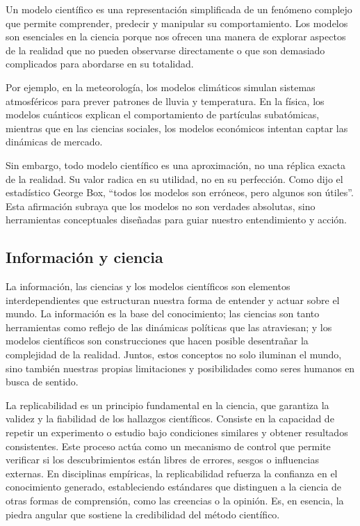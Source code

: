 \documentclass[
  letterpaper,
  DIV=11,
  numbers=noendperiod]{scrreprt}
\begin{document}
Un modelo científico es una representación simplificada de un fenómeno
complejo que permite comprender, predecir y manipular su comportamiento.
Los modelos son esenciales en la ciencia porque nos ofrecen una manera
de explorar aspectos de la realidad que no pueden observarse
directamente o que son demasiado complicados para abordarse en su
totalidad.

Por ejemplo, en la meteorología, los modelos climáticos simulan sistemas
atmosféricos para prever patrones de lluvia y temperatura. En la física,
los modelos cuánticos explican el comportamiento de partículas
subatómicas, mientras que en las ciencias sociales, los modelos
económicos intentan captar las dinámicas de mercado.

Sin embargo, todo modelo científico es una aproximación, no una réplica
exacta de la realidad. Su valor radica en su utilidad, no en su
perfección. Como dijo el estadístico George Box, ``todos los modelos son
erróneos, pero algunos son útiles''. Esta afirmación subraya que los
modelos no son verdades absolutas, sino herramientas conceptuales
diseñadas para guiar nuestro entendimiento y acción.

\subsection{Información y ciencia}\label{informaciuxf3n-y-ciencia}

La información, las ciencias y los modelos científicos son elementos
interdependientes que estructuran nuestra forma de entender y actuar
sobre el mundo. La información es la base del conocimiento; las ciencias
son tanto herramientas como reflejo de las dinámicas políticas que las
atraviesan; y los modelos científicos son construcciones que hacen
posible desentrañar la complejidad de la realidad. Juntos, estos
conceptos no solo iluminan el mundo, sino también nuestras propias
limitaciones y posibilidades como seres humanos en busca de sentido.

La replicabilidad es un principio fundamental en la ciencia, que
garantiza la validez y la fiabilidad de los hallazgos científicos.
Consiste en la capacidad de repetir un experimento o estudio bajo
condiciones similares y obtener resultados consistentes. Este proceso
actúa como un mecanismo de control que permite verificar si los
descubrimientos están libres de errores, sesgos o influencias externas.
En disciplinas empíricas, la replicabilidad refuerza la confianza en el
conocimiento generado, estableciendo estándares que distinguen a la
ciencia de otras formas de comprensión, como las creencias o la opinión.
Es, en esencia, la piedra angular que sostiene la credibilidad del
método científico.
\end{document}
